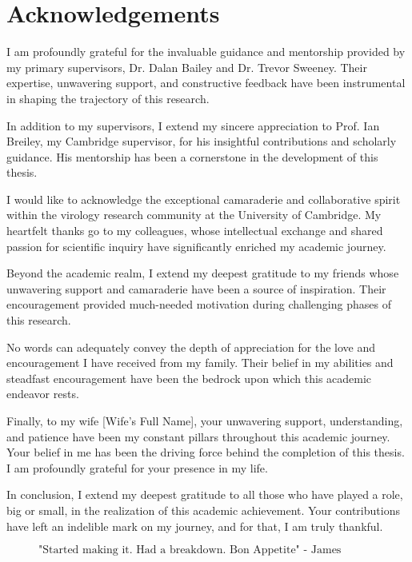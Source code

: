 \chapter{Acknowledgements}
I am profoundly grateful for the invaluable guidance and mentorship provided by my primary supervisors, Dr. Dalan Bailey and Dr. Trevor Sweeney. Their expertise, unwavering support, and constructive feedback have been instrumental in shaping the trajectory of this research.

In addition to my supervisors, I extend my sincere appreciation to Prof. Ian Breiley, my Cambridge supervisor, for his insightful contributions and scholarly guidance. His mentorship has been a cornerstone in the development of this thesis.

I would like to acknowledge the exceptional camaraderie and collaborative spirit within the virology research community at the University of Cambridge. My heartfelt thanks go to my colleagues, whose intellectual exchange and shared passion for scientific inquiry have significantly enriched my academic journey.

Beyond the academic realm, I extend my deepest gratitude to my friends whose unwavering support and camaraderie have been a source of inspiration. Their encouragement provided much-needed motivation during challenging phases of this research.

No words can adequately convey the depth of appreciation for the love and encouragement I have received from my family. Their belief in my abilities and steadfast encouragement have been the bedrock upon which this academic endeavor rests.

Finally, to my wife [Wife's Full Name], your unwavering support, understanding, and patience have been my constant pillars throughout this academic journey. Your belief in me has been the driving force behind the completion of this thesis. I am profoundly grateful for your presence in my life.

In conclusion, I extend my deepest gratitude to all those who have played a role, big or small, in the realization of this academic achievement. Your contributions have left an indelible mark on my journey, and for that, I am truly thankful.

\begin{figure}[b]
$$\mbox{"Started making it. Had a breakdown. Bon Appetite" - James Acaster}$$
\end{figure}


